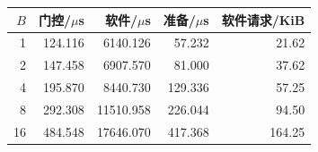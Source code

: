 \begin{tabular}{@{}rrrrr@{}}
\toprule
$B$ & 门控/$\mu$s & 软件/$\mu$s & 准备/$\mu$s & 软件请求/KiB\\\midrule
1 & 124.116 & 6140.126 & 57.232 & 21.62 \\
2 & 147.458 & 6907.570 & 81.000 & 37.62 \\
4 & 195.870 & 8440.730 & 129.336 & 57.25 \\
8 & 292.308 & 11510.958 & 226.044 & 94.50 \\
16 & 484.548 & 17646.070 & 417.368 & 164.25 \\
\bottomrule
\end{tabular}
